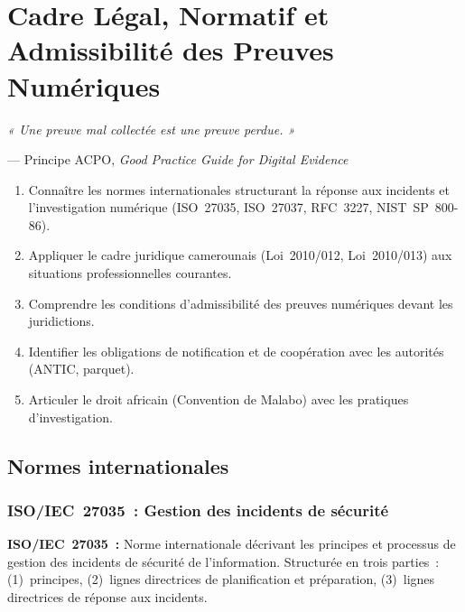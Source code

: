 \chapter{Cadre Légal, Normatif et Admissibilité des Preuves Numériques}
\label{chap:cadre-legal}

\epigraph{\itshape « Une preuve mal collectée est une preuve perdue. »}
         {--- Principe ACPO, \textit{Good Practice Guide for Digital Evidence}}

\begin{boxobjectifs}
\begin{enumerate}
  \item Connaître les normes internationales structurant la réponse aux incidents
        et l'investigation numérique (ISO~27035, ISO~27037, RFC~3227, NIST~SP~800-86).
  \item Appliquer le cadre juridique camerounais (Loi~2010/012, Loi~2010/013)
        aux situations professionnelles courantes.
  \item Comprendre les conditions d'admissibilité des preuves numériques
        devant les juridictions.
  \item Identifier les obligations de notification et de coopération avec les
        autorités (ANTIC, parquet).
  \item Articuler le droit africain (Convention de Malabo) avec les pratiques
        d'investigation.
\end{enumerate}
\end{boxobjectifs}

\section{Normes internationales}
\label{sec:normes-int}

\subsection{ISO/IEC~27035~: Gestion des incidents de sécurité}

\begin{boxdef}
\textbf{ISO/IEC~27035~:} Norme internationale décrivant les principes et
processus de gestion des incidents de sécurité de l'information. Structurée
en trois parties~: (1)~principes, (2)~lignes directrices de planification et
préparation, (3)~lignes directrices de réponse aux incidents.
\end{boxdef}

